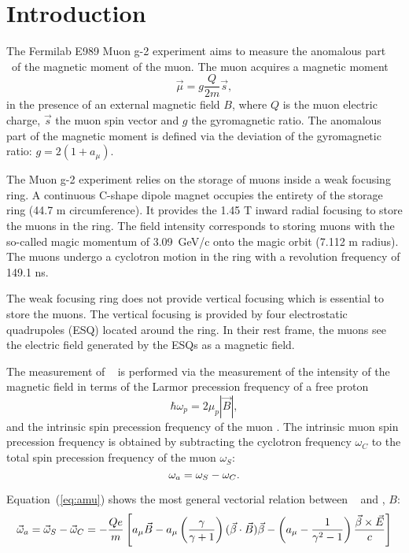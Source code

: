 \section{Introduction}

The Fermilab E989 Muon g-2 experiment aims to measure the anomalous part \amu\ of the magnetic moment of the muon.
The muon acquires a magnetic moment 
\begin{equation} 
\vec{\mu}=g \frac{Q}{2m} \vec{s},
\end{equation} in the presence of an external magnetic field $B$, where $Q$ is the muon electric charge, $\vec{s}$ the muon spin vector 
and $g$  the gyromagnetic ratio. 
The anomalous part of the magnetic moment is defined via the deviation of the gyromagnetic ratio: $g = 2(1+a_\mu)$.

The Muon g-2 experiment relies on the storage of muons inside a weak focusing ring. 
A continuous C-shape dipole magnet occupies the entirety of the storage ring (44.7 m circumference). 
It provides the 1.45 T inward radial focusing to store the muons in the ring. 
The field intensity corresponds to storing muons with the so-called magic momentum of \mbox{3.09 GeV/c} onto the magic orbit (7.112 m radius).
The muons undergo a cyclotron motion in the ring with a revolution frequency of 149.1 ns.

The weak focusing ring does not provide vertical focusing which is essential to store the muons. 
The vertical focusing is provided by four electrostatic quadrupoles (ESQ) located around the ring.
In their rest frame, the muons see the electric field generated by the ESQs as a magnetic field.

The measurement of \amu~ is performed via the measurement of the intensity of the magnetic field in terms of the Larmor precession frequency of a free proton 
\begin{equation}
\hbar \omega_{p} = 2 \mu_{p} | \overrightarrow{B}|,
\end{equation}
and the intrinsic spin precession frequency of the muon \wa. 
The intrinsic muon spin precession frequency is obtained by subtracting the cyclotron frequency $\omega_C$ to the total spin precession frequency of the muon $\omega_S$:
\begin{equation}
\mbox{\ensuremath{\omega_a}} = \omega_S - \omega_C.
\end{equation}

Equation~(\ref{eq:amu}) shows the most general vectorial relation between \amu~ and \wa, $B$:
\begin{equation}
\label{eq:amu}
\vec \omega_{a}=\vec \omega_S -\vec\omega_C 
=  - \frac{Qe}{ m}
\left[ a_{\mu} \vec B -  a_{\mu}\left( {\gamma \over \gamma + 1}\right)
(\vec \beta \cdot \vec B)\vec \beta 
- \left( a_{\mu}- {1 \over \gamma^2 - 1} \right) 
{ {\vec \beta \times \vec E }\over c }\right]
\end{equation}

